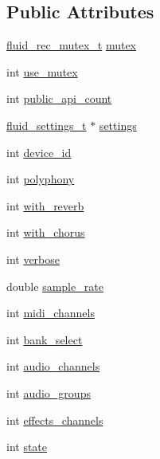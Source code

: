 \subsection*{Public Attributes}
\begin{DoxyCompactItemize}
\item 
\hyperlink{fluid__sys_8h_a8e5bc2095bf6a26aa487db766bfb6660}{fluid\+\_\+rec\+\_\+mutex\+\_\+t} \hyperlink{struct__fluid__synth__t_a0607c356835f4e0d2737a8d2427502a2}{mutex}
\item 
int \hyperlink{struct__fluid__synth__t_a93a302587ee5a959bc6f3cabf2c9670e}{use\+\_\+mutex}
\item 
int \hyperlink{struct__fluid__synth__t_a8a135cb1ecb5a6a1191f2500991a32ed}{public\+\_\+api\+\_\+count}
\item 
\hyperlink{types_8h_aa363402d3c77333b0f070ba531d034ba}{fluid\+\_\+settings\+\_\+t} $\ast$ \hyperlink{struct__fluid__synth__t_a443a36b056edaf9f15a6f7e15f579663}{settings}
\item 
int \hyperlink{struct__fluid__synth__t_a7b396ac714d234cf9a5b8d5e149f4387}{device\+\_\+id}
\item 
int \hyperlink{struct__fluid__synth__t_a4955d81f0303fc4729798ca89ee81781}{polyphony}
\item 
int \hyperlink{struct__fluid__synth__t_ae65cd480d1e7273f7f3b9bb242353210}{with\+\_\+reverb}
\item 
int \hyperlink{struct__fluid__synth__t_aa60eed2e27ed835cc776689510a43573}{with\+\_\+chorus}
\item 
int \hyperlink{struct__fluid__synth__t_a81dfb88d554fc0ddc8faff652fe95cfc}{verbose}
\item 
double \hyperlink{struct__fluid__synth__t_ae91d08160f2ab75e1a9eb320064acbc6}{sample\+\_\+rate}
\item 
int \hyperlink{struct__fluid__synth__t_a4ce77034120fa2551b3250946bbf6042}{midi\+\_\+channels}
\item 
int \hyperlink{struct__fluid__synth__t_a3b97457936d5897010cbec75efa9a4be}{bank\+\_\+select}
\item 
int \hyperlink{struct__fluid__synth__t_a35c32add2f161d86d837301c9b6d67e7}{audio\+\_\+channels}
\item 
int \hyperlink{struct__fluid__synth__t_a476122fb39bbdd36e3ad6387439b2f56}{audio\+\_\+groups}
\item 
int \hyperlink{struct__fluid__synth__t_a5748a0bdf7e8c14dcfbef8ef540393c4}{effects\+\_\+channels}
\item 
int \hyperlink{struct__fluid__synth__t_a77523060e140bd471265259a398ed30a}{state}

\end{DoxyCompactItemize}
